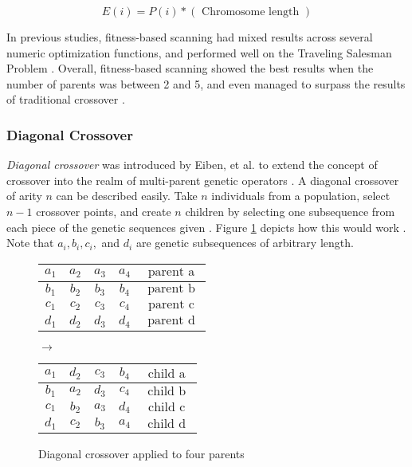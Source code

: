 \[ E(i) = P(i) *(\text{ Chromosome length }) \]

In previous studies, fitness-based scanning had mixed results across several numeric optimization functions, and performed well on the Traveling Salesman Problem \cite{Eiben94, Eiben95}. Overall, fitness-based scanning showed the best results when the number of parents was between 2 and 5, and even managed to surpass the results of traditional crossover \cite{Eiben94}. 

\subsubsection*{Diagonal Crossover}
\emph{Diagonal crossover} was introduced by Eiben, et al. to extend the concept of crossover into the realm of multi-parent genetic operators \cite{Eiben03}. A diagonal crossover of arity $n$ can be described easily. Take $n$ individuals from a population, select $n-1$ crossover points, and create $n$ children by selecting one subsequence from each piece of the genetic sequences given \cite{Eiben95}. Figure \ref{DC-Fig} depicts how this would work \cite{Eiben95}. Note that $a_i, b_i, c_i,$ and $d_i$ are genetic subsequences of arbitrary length.
\begin{figure}[h!]
\centering
\begin{tabular}{ | c | c | c | c | c | }
\hline
{\color{myred}$a_1$} & {\color{myred}$a_2$} & {\color{myred}$a_3$} & {\color{myred}$a_4$} & $\text{ parent a }$ 	\\ \hline
{\color{myblue}$b_1$} & {\color{myblue}$b_2$} & {\color{myblue}$b_3$} & {\color{myblue}$b_4$} & $\text{ parent b }$ 	\\ \hline
{\color{mygreen}$c_1$} & {\color{mygreen}$c_2$} & {\color{mygreen}$c_3$} & {\color{mygreen}$c_4$} & $\text{ parent c }$ 	\\ \hline
$d_1$ & $d_2$ & $d_3$ & $d_4$ & $\text{ parent d }$ 	\\ \hline
\end{tabular}
$\rightarrow$
\begin{tabular}{ | c | c | c | c | c | }
\hline
{\color{myred}$a_1$} & $d_2$ & {\color{mygreen}$c_3$} & {\color{myblue}$b_4$} & $\text{ child a }$ 	\\ \hline
{\color{myblue}$b_1$} & {\color{myred}$a_2$} & $d_3$ & {\color{mygreen}$c_4$} & $\text{ child b }$ 	\\ \hline
{\color{mygreen}$c_1$} & {\color{myblue}$b_2$} & {\color{myred}$a_3$} & $d_4$ & $\text{ child c }$ 	\\ \hline
$d_1$ & {\color{mygreen}$c_2$} & {\color{myblue}$b_3$} & {\color{myred}$a_4$} & $\text{ child d }$ 	\\ \hline
\end{tabular}
\caption{Diagonal crossover applied to four parents}
\label{DC-Fig}
\end{figure} 


